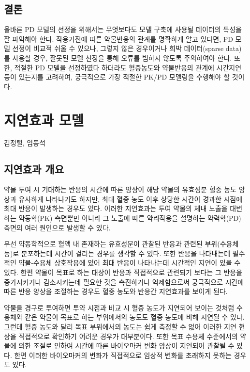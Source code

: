 \documentclass[
  11pt,
  krantz2,
  a4paper]{krantz}
\theoremstyle{definition}
\theoremstyle{definition}
\theoremstyle{definition}
\theoremstyle{remark}
\begin{document}
\hypertarget{uxacb0uxb860}{%
\section{결론}\label{uxacb0uxb860}}

올바른 PD 모델의 선정을 위해서는 무엇보다도 모델 구축에 사용될 데이터의 특성을 잘 파악해야 한다. 작용기전에 따른 약물반응의 관계를 명확하게 알고 있다면, PD 모델 선정이 비교적 쉬울 수 있으나, 그렇지 않은 경우이거나 희박 데이터(sparse data)를 사용할 경우, 잘못된 모델 선정을 통해 오류를 범하지 않도록 주의하여야 한다. 또한, 적절한 PD 모델을 선정하였다 하더라도 혈중농도와 약물반응의 관계에 시간지연 등이 있는지를 고려하여, 궁극적으로 가장 적절한 PK/PD 모델링을 수행해야 할 것이다.

\hypertarget{delayed-effect}{%
\chapter{지연효과 모델}\label{delayed-effect}}

\Large\hfill

김정렬, 임동석
\normalsize

\hypertarget{uxc9c0uxc5f0uxd6a8uxacfc-uxac1cuxc694}{%
\section{지연효과 개요}\label{uxc9c0uxc5f0uxd6a8uxacfc-uxac1cuxc694}}

약물 투여 시 기대하는 반응의 시간에 따른 양상이 해당 약물의 유효성분 혈중 농도 양상과 유사하게 나타나기도 하지만, 최대 혈중 농도 이후 상당한 시간이 경과한 시점에 최대 반응이 발생하는 경우도 있다. 이러한 지연효과는 투여 약물의 체내 노출을 대변하는 약동학(PK) 측면뿐만 아니라 그 노출에 따른 약리작용을 설명하는 약력학(PD) 측면의 여러 원인으로 발생할 수 있다.

우선 약동학적으로 혈액 내 존재하는 유효성분이 관찰된 반응과 관련된 부위(수용체 등)로 분포하는데 시간이 걸리는 경우를 생각할 수 있다. 또한 반응을 나타내는데 필수적인 약물-수용체 상호작용에 있어 최대 반응이 나타나는데 시간적인 지연이 있을 수 있다. 한편 약물이 목표로 하는 대상이 반응과 직접적으로 관련되기 보다는 그 반응을 증가시키거나 감소시키는데 필요한 것을 촉진하거나 억제함으로써 궁극적으로 시간에 따른 반응 양상을 조절하는 경우도 혈중 농도와 반응간 지연효과를 보이게 된다.

약물을 경구로 투여하면 투약 시점과 비교 시 혈중 농도가 지연되어 보이는 것처럼 수용체와 같은 약물이 목표로 하는 부위에서의 농도도 혈중 농도에 비해 지연될 수 있다. 그런데 혈중 농도와 달리 목표 부위에서의 농도는 쉽게 측정할 수 없어 이러한 지연 현상을 직접적으로 확인하기 어려운 경우가 대부분이다. 또한 목표 수용체 수준에서의 약물에 의한 조절로 인하여 시간에 따른 바이오마커 변화 양상이 지연되어 관찰될 수 있다. 한편 이러한 바이오마커의 변화가 직접적으로 임상적 변화를 초래하지 못하는 경우도 있다.
\end{document}
